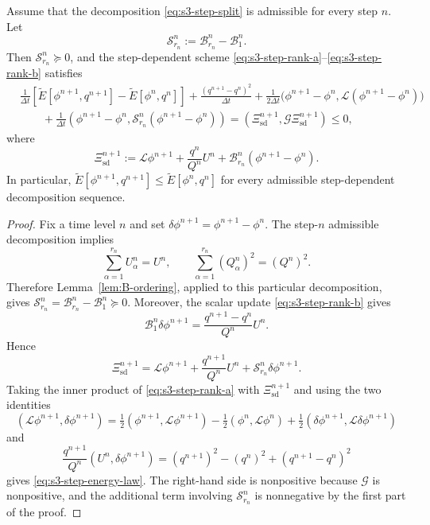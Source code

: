 \documentclass[10pt,onefignum,onetabnum,hidelinks]{siamart251216}
\begin{document}
\begin{theorem}
\label{thm:s3-step-dependent-stability}
Assume that the decomposition
\eqref{eq:s3-step-split} is admissible for every step $n$. Let
\[
\mathcal S_{r_n}^n:=\mathcal B_{r_n}^n-\mathcal B_1^n.
\]
Then $\mathcal S_{r_n}^n\succeq0$, and the
step-dependent scheme \eqref{eq:s3-step-rank-a}--\eqref{eq:s3-step-rank-b}
satisfies
\begin{align}
&\frac{1}{\Delta t}
\left[
\widetilde E[\phi^{n+1},q^{n+1}]
-
\widetilde E[\phi^n,q^n]
\right]
+
\frac{(q^{n+1}-q^n)^2}{\Delta t}
+
\frac{1}{2\Delta t}\bigl(\phi^{n+1}-\phi^n,\mathcal L(\phi^{n+1}-\phi^n)\bigr)
\nonumber\\
&\qquad
+
\frac{1}{\Delta t}
\left(
\phi^{n+1}-\phi^n,
\mathcal S_{r_n}^n(\phi^{n+1}-\phi^n)
\right)
=
\left(
\Xi_{\mathrm{sd}}^{n+1},
\mathcal G\Xi_{\mathrm{sd}}^{n+1}
\right)
\le0,
\label{eq:s3-step-energy-law}
\end{align}
where
\[
\Xi_{\mathrm{sd}}^{n+1}
:=
\mathcal L\phi^{n+1}
+
\frac{q^n}{Q^n}U^n
+
\mathcal B_{r_n}^n(\phi^{n+1}-\phi^n).
\]
In particular, $\widetilde E[\phi^{n+1},q^{n+1}]
\le \widetilde E[\phi^n,q^n]$ for every admissible step-dependent decomposition
sequence.
\end{theorem}

\begin{proof}
Fix a time level $n$ and set
\(\delta\phi^{n+1}=\phi^{n+1}-\phi^n\).  The step-$n$ admissible decomposition implies
\[
\sum_{\alpha=1}^{r_n}U_\alpha^n=U^n,
\qquad
\sum_{\alpha=1}^{r_n}(Q_\alpha^n)^2=(Q^n)^2.
\]
Therefore Lemma~\ref{lem:B-ordering}, applied to this particular decomposition, gives
\(\mathcal S_{r_n}^n=\mathcal B_{r_n}^n-\mathcal B_1^n\succeq0\).  Moreover, the scalar update \eqref{eq:s3-step-rank-b} gives
\[
\mathcal B_1^n\delta\phi^{n+1}
=
\frac{q^{n+1}-q^n}{Q^n}U^n.
\]
Hence
\[
\Xi_{\mathrm{sd}}^{n+1}
=
\mathcal L\phi^{n+1}
+
\frac{q^{n+1}}{Q^n}U^n
+
\mathcal S_{r_n}^n\delta\phi^{n+1}.
\]
Taking the inner product of \eqref{eq:s3-step-rank-a} with
\(\Xi_{\mathrm{sd}}^{n+1}\) and using the two identities
\[
(\mathcal L\phi^{n+1},\delta\phi^{n+1})
=
\tfrac12(\phi^{n+1},\mathcal L\phi^{n+1})-\tfrac12(\phi^n,\mathcal L\phi^n)
+\tfrac12(\delta\phi^{n+1},\mathcal L\delta\phi^{n+1})
\]
and
\[
\frac{q^{n+1}}{Q^n}(U^n,\delta\phi^{n+1})
=(q^{n+1})^2-(q^n)^2+(q^{n+1}-q^n)^2
\]
gives \eqref{eq:s3-step-energy-law}.  The right-hand side is nonpositive because
$\mathcal G$ is nonpositive, and the additional term involving
$\mathcal S_{r_n}^n$ is nonnegative by the first part of the proof.
\end{proof}
\end{document}
